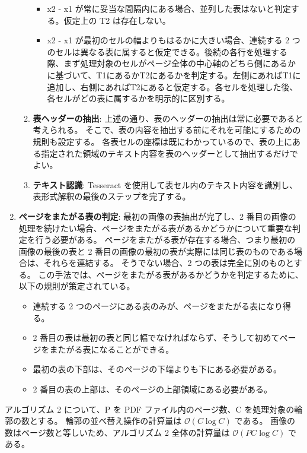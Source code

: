 \documentclass[uplatex, twocolumn,10pt]{jsarticle}
\begin{document}
\begin{enumerate}
\begin{enumerate}
\begin{itemize}
            \item x2 - x1 が常に妥当な間隔内にある場合、並列した表はないと判定する。仮定上の T2 は存在しない。
            \item x2 - x1 が最初のセルの幅よりもはるかに大きい場合、連続する 2 つのセルは異なる表に属すると仮定できる。後続の各行を処理する際、まず処理対象のセルがページ全体の中心軸のどちら側にあるかに基づいて、T1にあるかT2にあるかを判定する。左側にあればT1に追加し、右側にあればT2にあると仮定する。各セルを処理した後、各セルがどの表に属するかを明示的に区別する。
        \end{itemize}
        \item \textbf{表ヘッダーの抽出}:
        上述の通り、表のヘッダーの抽出は常に必要であると考えられる。
        そこで、表の内容を抽出する前にそれを可能にするための規則も設定する。
        各表セルの座標は既にわかっているので、表の上にある指定された領域のテキスト内容を表のヘッダーとして抽出するだけでよい。
        \item \textbf{テキスト認識}:
        Tesseract を使用して表セル内のテキスト内容を識別し、表形式解釈の最後のステップを完了する。
    \end{enumerate}
    \item \textbf{ページをまたがる表の判定}:
    最初の画像の表抽出が完了し、2 番目の画像の処理を続けたい場合、ページをまたがる表があるかどうかについて重要な判定を行う必要がある。
    ページをまたがる表が存在する場合、つまり最初の画像の最後の表と 2 番目の画像の最初の表が実際には同じ表のものである場合は、それらを連結する。
    そうでない場合、2 つの表は完全に別のものとする。
    この手法では、ページをまたがる表があるかどうかを判定するために、以下の規則が策定されている。
    \begin{itemize}
        \item 連続する 2 つのページにある表のみが、ページをまたがる表になり得る。
        \item 2 番目の表は最初の表と同じ幅でなければならず、そうして初めてページをまたがる表になることができる。
        \item 最初の表の下部は、そのページの下端よりも下にある必要がある。
        \item 2 番目の表の上部は、そのページの上部領域にある必要がある。
    \end{itemize}
\end{enumerate}

アルゴリズム 2 について、P を PDF ファイル内のページ数、C を処理対象の輪郭の数とする。
輪郭の並べ替え操作の計算量は $\mathcal{O} (C \log C)$ である。
画像の数はページ数と等しいため、アルゴリズム 2 全体の計算量は $\mathcal{O} (PC \log C)$ である。
\end{document}
